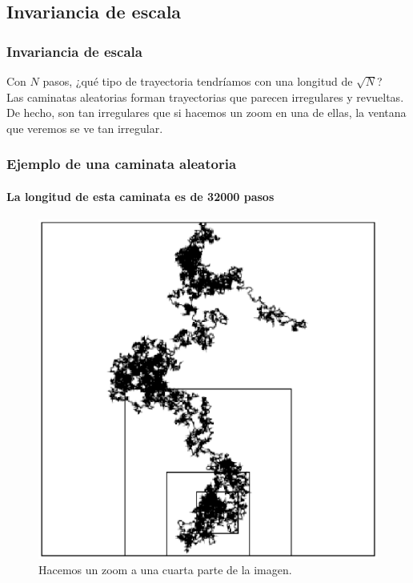\subsection*{Invariancia de escala}
\begin{frame}
\frametitle{Invariancia de escala}
Con $N$ pasos, ¿qué tipo de trayectoria tendríamos con una longitud de $\sqrt{N}$?
\\
\bigskip
\pause
Las caminatas aleatorias forman trayectorias que parecen irregulares y revueltas. 
\\
\bigskip
De hecho, son tan irregulares que si hacemos un zoom en una de ellas, la ventana que veremos se ve tan irregular.
\end{frame}
\begin{frame}[plain]
\frametitle{Ejemplo de una caminata aleatoria}
\framesubtitle{La longitud de esta caminata es de 32000 pasos}
\begin{figure}
	\centering
	\includegraphics[scale=0.5]{Imagenes/caminataAleatoria_01.eps}
	\caption{Hacemos un zoom a una cuarta parte de la imagen.}
\end{figure}
\end{frame}
